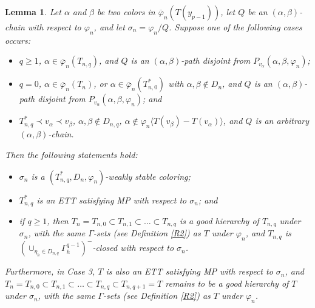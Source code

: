 \documentclass[11pt]{article}
\newtheorem{lemma}[theorem]{Lemma}
\newcommand{\phibar}{\overline{\varphi}}
\newcommand{\phiv}{\varphi}
\begin{document}
\begin{lemma}\label{stablechange}
Let $\alpha$ and $\beta$ be two colors in $\phibar_n(T(y_{p-1}))$, let $Q$ be an $(\alpha,\beta)$-chain with
respect to $\varphi_n$, and let $\sigma_n=\varphi_n/Q$. Suppose one of the following cases occurs:
\begin{itemize}
\vspace{-2mm}
\item[1)] $q\geq 1$, $\alpha\in\phibar_n(T_{n,q})$, and $Q$ is an $(\alpha,\beta)$-path disjoint from $P_{v_{\alpha}}(\alpha,\beta,\varphi_n)$;
\vspace{-2mm}
\item[2)] $q=0$, $\alpha\in\phibar_n(T_{n})$, or $\alpha\in\phibar_n(T_{n,0}^*)$ with $\alpha,\beta\notin D_n$, and 
$Q$ is an $(\alpha,\beta)$-path disjoint from $P_{v_{\alpha}}(\alpha,\beta,\varphi_n)$; and
\vspace{-2mm}
\item[3)] $T_{n,q}^*\prec v_{\alpha} \prec v_{\beta}$, $\alpha,\beta\notin D_{n,q}$, $\alpha\notin \phiv_n \langle T(v_{\beta})-T(v_{\alpha}) \rangle$, and $Q$ is an arbitrary $(\alpha,\beta)$-chain.

\vspace{-2mm}
\end{itemize} 
Then the following statements hold:
\begin{itemize}
\vspace{-1.5mm}
\item[(i)] $\sigma_n$ is a $(T_{n,q}^*, D_n,\varphi_n)$-weakly stable coloring;
\vspace{-2mm} 
\item[(ii)] $T_{n,q}^*$ is an ETT satisfying MP with respect to $\sigma_n$; and
\vspace{-2mm}
\item[(iii)] if $q \ge 1$, then  $T_n=T_{n,0} \subset T_{n,1} \subset \ldots \subset T_{n,q}$ is a good hierarchy 
of $T_{n,q}$ under $\sigma_n$, with the same $\Gamma$-sets (see Definition \ref{R2}) as $T$ under $\varphi_n$,
and $T_{n,q}$ is $(\cup_{\eta_h\in D_{n,q}}\Gamma^{q-1}_h)^-$-closed with respect to $\sigma_n$.
\vspace{-2mm}
\end{itemize}
Furthermore, in Case 3, $T$ is also an ETT satisfying MP with respect to $\sigma_n$, and $T_n=T_{n,0} \subset T_{n,1}
\subset \ldots \subset T_{n,q}\subset T_{n,q+1}=T$ remains to be a good hierarchy of $T$ under $\sigma_n$, with the 
same $\Gamma$-sets (see Definition \ref{R2}) as $T$ under $\varphi_n$. 
\end{lemma}
\end{document}
